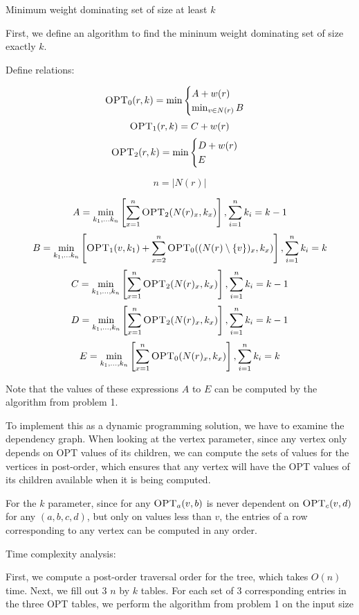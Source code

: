 \documentclass{article}
\begin{document}
Minimum weight dominating set of size at least $k$

First, we define an algorithm to find the mininum weight dominating set of
size exactly $k$.

Define relations:

$$\textsc{OPT}_0(r, k) = \min 
\begin{cases} 
    A + w(r) \\
    \min_{v \in N(r)} B
\end{cases}$$
$$\textsc{OPT}_1(r, k) = C + w(r)$$
$$\textsc{OPT}_2(r, k) = \min
\begin{cases}
    D + w(r) \\
    E
\end{cases}$$

$$n = |N(r)|$$

$$A = \min_{k_1,...k_n} \left[\sum_{x = 1}^n \textsc{OPT}_2(N(r)_x, k_x) \right], \sum_{i=1}^n
k_i = k - 1$$
$$B = \min_{k_1,...k_n} \left[\textsc{OPT}_1(v,k_1) + \sum_{x = 2}^n
\textsc{OPT}_0((N(r) \setminus \{v\})_x, k_x) \right], \sum_{i=1}^n
k_i = k$$
$$C = \min_{k_1,...,k_n} \left[ \sum_{x=1}^n \textsc{OPT}_2(N(r)_x,k_x)\right], \sum_{i=1}^n
k_i = k - 1$$
$$D = \min_{k_1,...,k_n} \left[\sum_{x=1}^n \textsc{OPT}_2(N(r)_x, k_x)\right], \sum_{i=1}^n
k_i = k - 1 $$
$$E = \min_{k_1,...,k_n} \left[\sum_{x=1}^n \textsc{OPT}_0(N(r)_x, k_x)\right], \sum_{i=1}^n
k_i = k$$

Note that the values of these expressions $A$ to $E$ can be computed by the
algorithm from problem 1.

To implement this as a dynamic programming solution, we have to examine the
dependency graph. When looking at the vertex parameter, since any vertex only
depends on \textsc{OPT} values of its children, we can compute the
sets of values for the vertices in post-order, which ensures that any vertex
will have the \textsc{OPT} values of its children available when it is being
computed.

For the $k$ parameter, since for any $\textsc{OPT}_a(v,b)$ is never dependent
on $\textsc{OPT}_c(v,d)$ for any $(a,b,c,d)$, but only on values less than
$v$, the entries of a row corresponding to any vertex can be computed in any
order. 


Time complexity analysis:

First, we compute a post-order traversal order for the tree, which takes
$O(n)$ time. Next, we fill out 3 $n$ by $k$ tables. For each set of 3
corresponding entries in the three \textsc{OPT} tables, we perform the
algorithm from problem 1 on the input size
\end{document}
